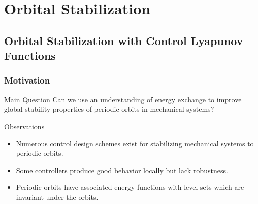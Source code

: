 \section{Orbital Stabilization}
\showtoc

\subsection{Orbital Stabilization with Control Lyapunov Functions}
\begin{frame}
  \frametitle{Motivation}
  \begin{block}{Main Question}
    Can we use an understanding of energy exchange to improve global stability properties of periodic orbits in mechanical systems?
  \end{block}

  \begin{block}{Observations}
    \begin{itemize}
    \item Numerous control design schemes exist for stabilizing mechanical systems to periodic orbits.
    \item Some controllers produce good behavior locally but lack robustness.
    \item Periodic orbits have associated energy functions with level sets which are invariant under the orbits.
    \end{itemize}
  \end{block}
\end{frame}

